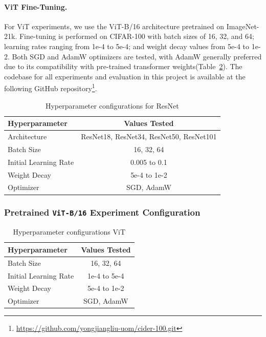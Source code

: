 \documentclass[conference]{IEEEtran}
\begin{document}
\paragraph{ViT Fine-Tuning.} For ViT experiments, we use the ViT-B/16 architecture pretrained on ImageNet-21k. Fine-tuning is performed on CIFAR-100 with batch sizes of 16, 32, and 64; learning rates ranging from 1e-4 to 5e-4; and weight decay values from 5e-4 to 1e-2. Both SGD and AdamW optimizers are tested, with AdamW generally preferred due to its compatibility with pre-trained transformer weights(Table~\ref{tab:hyperparameters_ViT}). The codebase for all experiments and evaluation in this project is available at the following GitHub repository\footnote{\url{https://github.com/yongjiangliu-uom/cider-100.git}}.


\begin{table}[!h]
\centering
\caption{Hyperparameter configurations for ResNet}
\label{tab:hyperparameters_resnet}
\begin{tabular}{@{}lc@{}}
\toprule
\toprule
\textbf{Hyperparameter} & \textbf{Values Tested} \\
\midrule
Architecture & ResNet18, ResNet34, ResNet50, ResNet101 \\
Batch Size & 16, 32, 64 \\
Initial Learning Rate & 0.005 to 0.1 \\
Weight Decay & 5e-4 to 1e-2 \\
Optimizer & SGD, AdamW \\
\bottomrule
\bottomrule
\end{tabular}
\end{table}

\subsubsection{Pretrained \texttt{ViT-B/16} Experiment Configuration}

\begin{table}[!h]
\centering
\caption{Hyperparameter configurations ViT}
\label{tab:hyperparameters_ViT}
\begin{tabular}{@{}lc@{}}
\toprule
\toprule
\textbf{Hyperparameter} & \textbf{Values Tested} \\
\midrule
Batch Size & 16, 32, 64 \\
Initial Learning Rate & 1e-4 to 5e-4 \\
Weight Decay & 5e-4 to 1e-2 \\
Optimizer & SGD, AdamW \\
\bottomrule
\bottomrule
\end{tabular}
\end{table}
\end{document}
